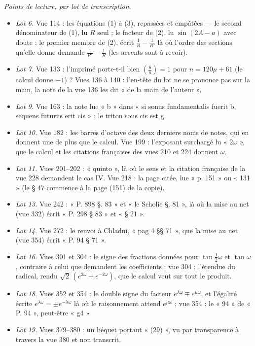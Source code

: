 \documentclass[11pt,a4paper]{article}
\begin{document}
\emph{Points de lecture, par lot de transcription.}
\begin{itemize}
\item \emph{Lot 6.} Vue 114 : les équations (1) à (3), repassées et empâtées — le
second dénominateur de (1), lu $R$ seul ; le facteur de (2), lu $\sin(2A-a)$ avec
doute ; le premier membre de (2), écrit $\frac1R-\frac1{R'}$ là où l'ordre des
sections qu'elle donne demande $\frac1{R'}-\frac1R$ (les accents sont à revoir).
\item \emph{Lot 7.} Vue 133 : l'imprimé porte-t-il bien
$\left(\frac6n\right)=1$ pour $n=120\mu+61$ (le calcul donne $-1$) ? Vues 136 à
140 : l'en-tête du lot ne se prononce pas sur la main, la note de la vue 136 les
dit « de la main de l'auteur ».
\item \emph{Lot 9.} Vue 163 : la note lue « b » dans « si sonus fundamentalis
fuerit b, sequens futurus erit cis » ; le triton sous cis est g.
\item \emph{Lot 10.} Vue 182 : les barres d'octave des deux derniers noms de
notes, qui en donnent une de plus que le calcul. Vue 199 : l'exposant surchargé lu
« $2\omega$ », que le calcul et les citations françaises des vues 210 et 224
donnent $\omega$.
\item \emph{Lot 11.} Vues 201--202 : « quinto », là où le sens et la citation
française de la vue 228 demandent le cas IV. Vue 218 : la page citée, lue
« p. 151 » ou « 131 » (le § 47 commence à la page (151) de la copie).
\item \emph{Lot 13.} Vue 242 : « P. 898 §. 83 » et « le Scholie §. 81 », là où la
mise au net (vue 332) écrit « P. 298 § 83 » et « § 21 ».
\item \emph{Lot 14.} Vue 272 : le renvoi à Chladni, « pag 4 §§ 71 », que la mise au
net (vue 354) écrit « P. 94 § 71 ».
\item \emph{Lot 16.} Vues 301 et 304 : le signe des fractions données pour
$\tan\frac12\omega$ et $\tan\omega$, contraire à celui que demandent les
coefficients ; vue 304 : l'étendue du radical, rendu
$\sqrt2\,(e^{2\omega}+e^{-2\omega})$, que le calcul veut sur tout le produit.
\item \emph{Lot 18.} Vues 352 et 354 : le double signe du facteur
$e^{\lambda\omega}\mp e^{\mu\omega}$, et l'égalité écrite
$e^{\lambda\omega}=\pm e^{-\lambda\omega}$ là où le raisonnement attend
$e^{\mu\omega}$ ; vue 354 : le « 94 » de « P. 94 », peut-être « g4 ».
\item \emph{Lot 19.} Vues 379--380 : un béquet portant « (29) », vu par
transparence à travers la vue 380 et non transcrit.

\end{itemize}
\end{document}
